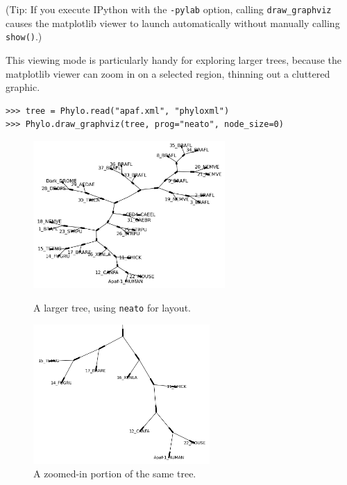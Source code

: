 \documentclass{report}
\begin{document}
(Tip: If you execute IPython with the \verb|-pylab| option, calling \verb|draw_graphviz| causes
the matplotlib viewer to launch automatically without manually calling \verb|show()|.)

This viewing mode is particularly handy for exploring larger trees, because the matplotlib
viewer can zoom in on a selected region, thinning out a cluttered graphic.

\begin{verbatim}
>>> tree = Phylo.read("apaf.xml", "phyloxml")
>>> Phylo.draw_graphviz(tree, prog="neato", node_size=0)
\end{verbatim}

\begin{htmlonly}
\label{fig:phylo-apaf}

\label{fig:phylo-apaf-zoom}
\end{htmlonly}

\begin{latexonly}
  \begin{figure}[tbp]
    \centering
    \includegraphics[width=0.65\textwidth]{images/phylo-apaf.png} \\
    \caption{A larger tree, using {\tt neato} for layout.}
    \label{fig:phylo-apaf}
  \end{figure}
  \begin{figure}[btp]
    \centering
    \includegraphics[width=0.6\textwidth]{images/phylo-apaf-zoom.png}
    \caption{A zoomed-in portion of the same tree.}
    \label{fig:phylo-apaf-zoom}
  \end{figure}
\end{latexonly}
\end{document}
